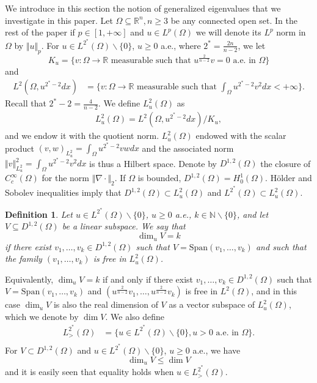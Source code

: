 \documentclass[10pt]{amsart}
\numberwithin{equation}{section}
\newcommand{\R}{\mathbb{R}}
\newcommand{\Om}{\Omega}
\theoremstyle{plain}
\newtheorem{defi}{Definition}[section]%
\theoremstyle{remark}
\begin{document}
We introduce in this section the notion of generalized eigenvalues that we investigate in this paper. Let $\Om \subseteq \R^n, n\ge3$ be any connected open set. In the rest of the paper if $p \in [1, + \infty]$ and $u \in L^p(\Om)$ we will denote its $L^p$ norm in $\Om$ by $\Vert u \Vert_p$. For $u \in L^{2^*}(\Om)\backslash \{0\}$,  $u\ge0$ a.e., where $2^* = \frac{2n}{n-2}$, we let 
$$K_u = \Big \{ v: \Om \to \R \text{ measurable such that }  u^{\frac{2}{n-2}} v = 0 \text{ a.e. in } \Om \Big \} $$
and
$$ \begin{aligned}
L^2(\Om, u^{2^*-2}dx) 
  &= \Big \{ v: \Om \to \R \text{ measurable such that }\int_{\Om} u^{2^*-2} v^2 dx < + \infty \Big \}. 
\end{aligned} $$
Recall that $2^*-2 = \frac{4}{n-2}$. We define $L^2_u(\Om)$ as
$$ \begin{aligned}
L^2_u(\Om) = L^2(\Om, u^{2^*-2}dx) / K_u,
 \end{aligned}  $$
and we endow it with the quotient norm. $L^2_u(\Om)$ endowed with the scalar product $(v,w)_{L^2_u} = \int_{\Om} u^{2^*-2} vw dx$ and the associated norm $ \Vert v \Vert_{L^2_u}^2 =  \int_{\Om} u^{2^*-2} v^2 dx$ is thus a Hilbert space. Denote by $D^{1,2}(\Om)$ the closure of $C^\infty_c(\Om)$ for the norm $\Vert \nabla \cdot \Vert_{2}$. If $\Om$ is bounded, $D^{1,2}(\Om) = H^1_0(\Om)$. H\"older and Sobolev inequalities imply that $D^{1,2}(\Om)\subset L^2_u(\Om)$ and $L^{2^*}(\Om) \subset L^2_u(\Om)$. 
\begin{defi} \label{defiL2u}
Let $u \in L^{2^*}(\Om)\backslash \{0\}$, $u \ge0$ a.e., $k\in \mathbb{N} \backslash \{0\}$, and let $V \subseteq D^{1,2}(\Om)$ be a linear subspace. We say that 
$$ \dim_u V = k $$
if there exist $v_1, \dots, v_k \in D^{1,2}(\Om)$ such that $V = \text{Span}(v_1, \dots, v_k)$ and such that the family $(v_1, \dots, v_k)$ is free in $L^2_u(\Om)$. 
\end{defi}
Equivalently, $\dim_u V = k$ if and only if there exist $v_1, \dots, v_k \in D^{1,2}(\Om)$ such that $V = \text{Span}(v_1, \dots, v_k)$ and $(u^{\frac{2}{n-2}}v_1, \dots, u^{\frac{2}{n-2}}v_k)$ is free in $L^2(\Om)$, and in this case $\dim_u V$ is also the real dimension of $V$ as a vector subspace of $L^2_u(\Om)$, which we denote by $\dim V$. We also define
\begin{equation} \label{defLu}
 \begin{aligned}
L^{2^*}_>(\Om) & = \big \{ u\in L^{2^*}(\Om) \backslash \{0\}, u > 0 \text{ a.e. in } \Omega \big \}.  \\
\end{aligned} 
\end{equation}
For $V \subset D^{1,2}(\Om)$ and $u \in L^{2^*}(\Omega) \backslash \{0\}$, $u \ge 0$ a.e.,  we have 
$$ \dim_u V \le \dim V $$
and it is easily seen that equality holds when $u \in L^{2^*}_{>}(\Om)$.
\end{document}
